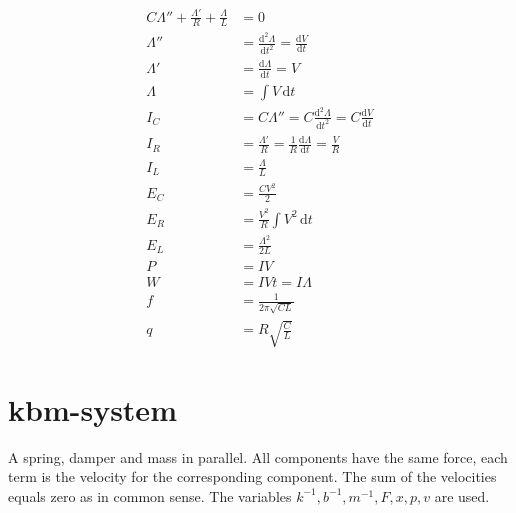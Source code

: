 \documentclass[]{../common/elementary-physics}
\begin{document}
\begin{subequations}
\begin{align}
C \Lambda'' + \frac{\Lambda'}{R} + \frac{\Lambda}{L} &= 0 \\
\Lambda'' &= \frac{\mathrm{d}^2 \Lambda}{\mathrm{d}t^2} = \frac{\mathrm{d}V}{\mathrm{d}t} \\
\Lambda' &= \frac{\mathrm{d} \Lambda}{\mathrm{d}t} = V \tag{Faraday's law} \\
\Lambda &= \int V \, \mathrm{d}t \\
I_C &= C \Lambda'' = C \frac{\mathrm{d}^2 \Lambda}{\mathrm{d}t^2} = C \frac{\mathrm{d}V}{\mathrm{d}t} \\
I_R &= \frac{\Lambda'}{R} = \frac{1}{R} \frac{\mathrm{d}\Lambda}{\mathrm{d}t} = \frac{V}{R} \\
I_L &= \frac{\Lambda}{L} \tag{definition of inductance} \\
E_C &= \frac{C V^2}{2} \tag{energy in a capacitor} \\
E_R &= \frac{V^2}{R} \int V^2 \, \mathrm{d}t \tag{losses} \\
E_L &= \frac{\Lambda^2}{2 L} \tag{energy in a coil} \\
P &= I V \tag{power} \\
W &= I V t = I \Lambda \tag{work} \\
f &= \frac{1}{2 \pi \sqrt{C L}} \tag{frequency} \\
q &= R \sqrt{\frac{C}{L}} \tag{quality factor}
\end{align}
\end{subequations}

\pagebreak

\section{kbm-system}

A spring, damper and mass in parallel.
All components have the same force, each term is the velocity for the corresponding component.
The sum of the velocities equals zero as in common sense.
The variables $k^{-1},b^{-1},m^{-1},F,x,p,v$ are used.
\end{document}
